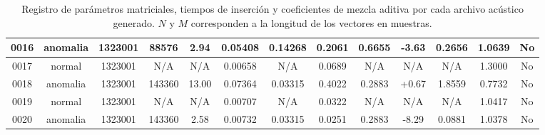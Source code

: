 \begin{table}[h!]
{\begin{tabular}{|c|c|c|c|c|c|c|c|c|c|c|c|c|}
0016 & anomalia & 1323001 & 88576 & 2.94 & 0.05408 & 0.14268 & 0.2061 & 0.6655 & -3.63 & 0.2656 & 1.0639 & No \\ \hline
0017 & normal & 1323001 & N/A & N/A & 0.00658 & N/A & 0.0689 & N/A & N/A & N/A & 1.3000 & No \\ \hline
0018 & anomalia & 1323001 & 143360 & 13.00 & 0.07364 & 0.03315 & 0.4022 & 0.2883 & +0.67 & 1.8559 & 0.7732 & No \\ \hline
0019 & normal & 1323001 & N/A & N/A & 0.00707 & N/A & 0.0322 & N/A & N/A & N/A & 1.0417 & No \\ \hline
0020 & anomalia & 1323001 & 143360 & 2.58 & 0.00732 & 0.03315 & 0.0251 & 0.2883 & -8.29 & 0.0881 & 1.0378 & No \\ \hline
\end{tabular}
}
\vspace{0.2cm}
\caption{Registro de parámetros matriciales, tiempos de inserción y coeficientes de mezcla aditiva por cada archivo acústico generado. $N$ y $M$ corresponden a la longitud de los vectores en muestras.}
\label{tab:bitacora_generacion}
\end{table}
